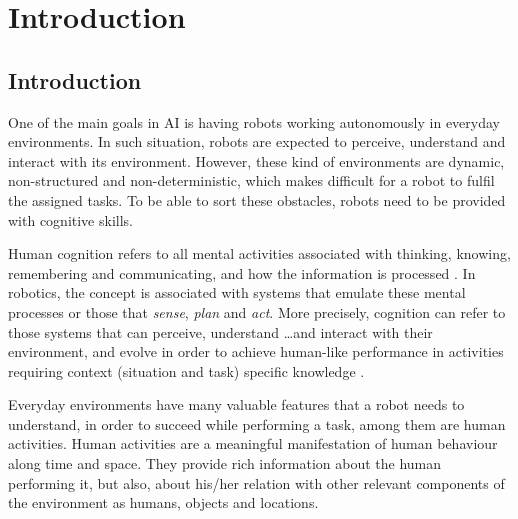 \chapter{Introduction}

\section{Introduction}
One of the main goals in AI is having robots working autonomously in everyday environments. 
In such situation, robots are expected to perceive, understand and interact with its environment. 
However, these kind of environments are dynamic, non-structured and non-deterministic, which makes difficult for a robot to fulfil the assigned tasks. 
To be able to sort these obstacles, robots need to be provided with cognitive skills.

Human cognition refers to all mental activities associated with thinking, knowing, remembering and communicating, and how the information is processed \citep{King2014Psychology,myers2013psychology}. 
In robotics, the concept is associated with systems that emulate these mental processes or those that \textit{sense}, \textit{plan} and \textit{act}.
More precisely, cognition can refer to those systems that can perceive, understand \ldots and interact with their environment, and evolve in order to achieve human-like performance in activities requiring context (situation and task) specific knowledge \citep{christensen2010cognitive}.

Everyday environments have many valuable features that a robot needs to understand, in order to succeed while performing a task, among them are human activities.
Human activities are a meaningful manifestation of human behaviour along time and space. %
They provide rich information about the human performing it, but also, about his/her relation with other relevant components of the environment as humans, objects and locations.


